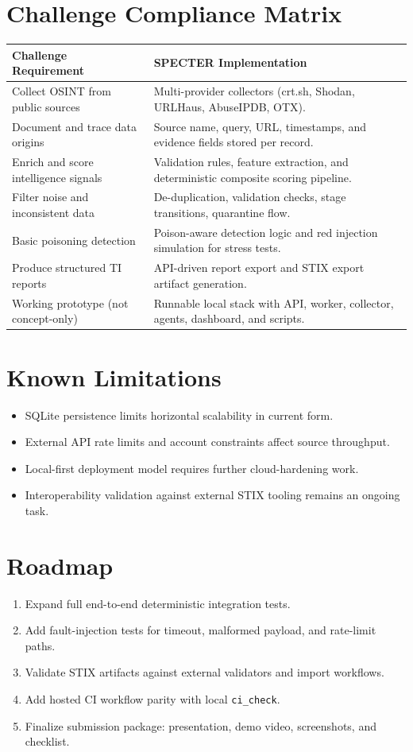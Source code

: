 \documentclass[11pt,a4paper]{article}
\begin{document}
\section{Challenge Compliance Matrix}
\begin{longtable}{p{} p{}}
\toprule
\textbf{Challenge Requirement} & \textbf{SPECTER Implementation} \\
\midrule
Collect OSINT from public sources & Multi-provider collectors (crt.sh, Shodan, URLHaus, AbuseIPDB, OTX). \\
Document and trace data origins & Source name, query, URL, timestamps, and evidence fields stored per record. \\
Enrich and score intelligence signals & Validation rules, feature extraction, and deterministic composite scoring pipeline. \\
Filter noise and inconsistent data & De-duplication, validation checks, stage transitions, quarantine flow. \\
Basic poisoning detection & Poison-aware detection logic and red injection simulation for stress tests. \\
Produce structured TI reports & API-driven report export and STIX export artifact generation. \\
Working prototype (not concept-only) & Runnable local stack with API, worker, collector, agents, dashboard, and scripts. \\
\bottomrule
\end{longtable}

\section{Known Limitations}
\begin{itemize}[leftmargin=1.5em]
  \item SQLite persistence limits horizontal scalability in current form.
  \item External API rate limits and account constraints affect source throughput.
  \item Local-first deployment model requires further cloud-hardening work.
  \item Interoperability validation against external STIX tooling remains an ongoing task.
\end{itemize}

\section{Roadmap}
\begin{enumerate}[leftmargin=1.5em]
  \item Expand full end-to-end deterministic integration tests.
  \item Add fault-injection tests for timeout, malformed payload, and rate-limit paths.
  \item Validate STIX artifacts against external validators and import workflows.
  \item Add hosted CI workflow parity with local \texttt{ci\_check}.
  \item Finalize submission package: presentation, demo video, screenshots, and checklist.
\end{enumerate}
\end{document}
